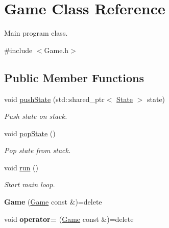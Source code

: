 \hypertarget{classGame}{\section{Game Class Reference}
\label{classGame}
}


Main program class.  




{\ttfamily \#include $<$Game.\-h$>$}

\subsection*{Public Member Functions}
\begin{DoxyCompactItemize}
\item 
\hypertarget{classGame_ade1d35f91a6fe6b6da70d7caebd174f6}{void \hyperlink{classGame_ade1d35f91a6fe6b6da70d7caebd174f6}{push\-State} (std\-::shared\-\_\-ptr$<$ \hyperlink{classState}{State} $>$ state)}\label{classGame_ade1d35f91a6fe6b6da70d7caebd174f6}

\begin{DoxyCompactList}\small\item\em Push state on stack. \end{DoxyCompactList}\item 
\hypertarget{classGame_a4b33dd67adef59bebadba8a234282c88}{void \hyperlink{classGame_a4b33dd67adef59bebadba8a234282c88}{pop\-State} ()}\label{classGame_a4b33dd67adef59bebadba8a234282c88}

\begin{DoxyCompactList}\small\item\em Pop state from stack. \end{DoxyCompactList}\item 
\hypertarget{classGame_a1ab78f5ed0d5ea879157357cf2fb2afa}{void \hyperlink{classGame_a1ab78f5ed0d5ea879157357cf2fb2afa}{run} ()}\label{classGame_a1ab78f5ed0d5ea879157357cf2fb2afa}

\begin{DoxyCompactList}\small\item\em Start main loop. \end{DoxyCompactList}\item 
\hypertarget{classGame_a586a831ed5ff1283fcf1b96f4eff065c}{{\bfseries Game} (\hyperlink{classGame}{Game} const \&)=delete}\label{classGame_a586a831ed5ff1283fcf1b96f4eff065c}

\item 
\hypertarget{classGame_aa4c0eacd8656e54ec4e94877c453e531}{void {\bfseries operator=} (\hyperlink{classGame}{Game} const \&)=delete}\label{classGame_aa4c0eacd8656e54ec4e94877c453e531}

\end{DoxyCompactItemize}
